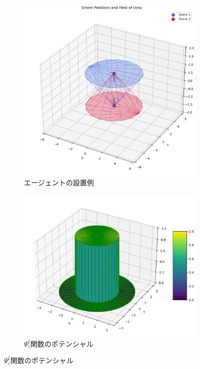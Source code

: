 \begin{figure}[H]
    \centering
    \begin{subfigure}[b]{0.45\linewidth}
        \includegraphics[width=\linewidth]{fig/drone_setup.png}
        \caption{エージェントの設置例}
        \label{fig:drone_setup}
    \end{subfigure}
    \hfill
    \begin{subfigure}[b]{0.45\linewidth}
        \includegraphics[width=\linewidth]{fig/psi_function_potential.png}
        \caption{$\Psi_{i}^l$関数のポテンシャル}
        \label{fig:psi_function_potential}
    \end{subfigure}
    

\end{figure}

